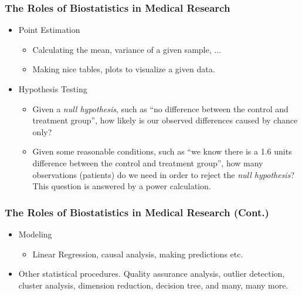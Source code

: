 \begin{frame} \frametitle{The Roles of Biostatistics in Medical
    Research}
  \begin{itemize}
  \item Point Estimation
    \begin{itemize}
    \item Calculating the mean, variance of a given sample, $\dots$
    \item Making nice tables, plots to visualize a given data.
    \end{itemize}
  \item Hypothesis Testing
    \begin{itemize}
    \item Given a \emph{null hypothesis}, such as ``no difference between the control and treatment group'',
      how likely is our observed differences caused by chance only?
    \item Given some reasonable conditions, such as ``we know there \alert{is} a 1.6 units difference
      between the control and treatment group'', how many observations (patients) do we need
      in order to \alert{reject} the \emph{null hypothesis}? This question is answered by a power calculation.
    \end{itemize}
  \end{itemize}
\end{frame}

\begin{frame} \frametitle{The Roles of Biostatistics in Medical
    Research (Cont.)}
  \begin{itemize}
  \item Modeling
    \begin{itemize}
    \item Linear Regression, causal analysis, making predictions etc.
    \end{itemize}
  \item Other statistical procedures. Quality assurance analysis,
    outlier detection, cluster analysis, dimension reduction, decision
    tree, and many, many more.
  \end{itemize}
\end{frame}

